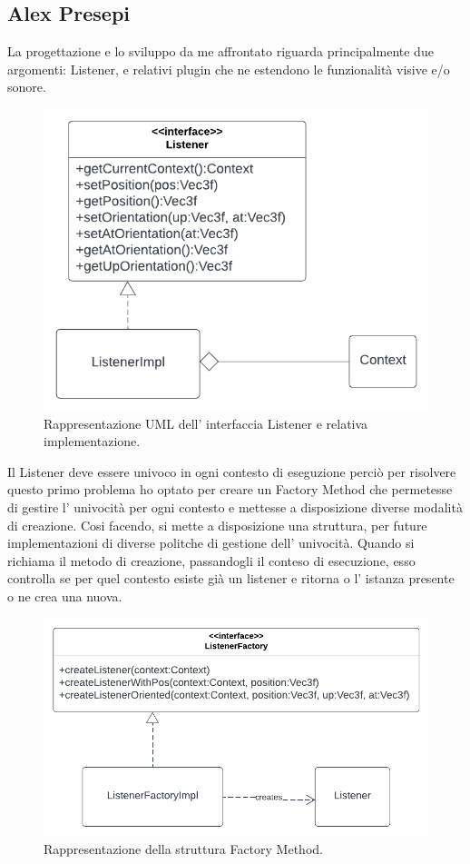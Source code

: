 \documentclass[a4paper,12pt]{report}
\begin{document}
\subsection*{Alex Presepi}
La progettazione e lo sviluppo da me affrontato riguarda principalmente due argomenti: Listener, e relativi plugin 
che ne estendono le funzionalità visive e/o sonore.
\begin{figure}[H]
\centering{}
\includegraphics[width=\textwidth]{img/listener/Listener.png}
\caption{Rappresentazione UML dell' interfaccia Listener e relativa implementazione.}
\label{img:Listener}
\end{figure}
%
Il Listener deve essere univoco in ogni contesto di eseguzione perciò per risolvere questo primo problema ho optato per creare un Factory Method che permetesse di gestire l' univocità per ogni contesto e mettesse a disposizione diverse modalità di creazione. Cosi facendo, si mette a disposizione una struttura, per future  implementazioni di diverse politche di gestione dell' univocità. Quando si richiama il metodo di creazione, 
passandogli il conteso di esecuzione, esso controlla se per quel contesto esiste già un listener e ritorna o l' istanza presente o ne crea una nuova. 
\begin{figure}[H]
\centering{}
\includegraphics[width=\textwidth]{img/listener/ListenerFactory.png}
\caption{Rappresentazione della struttura Factory Method.}
\label{img:Listener}
\end{figure}
\end{document}
